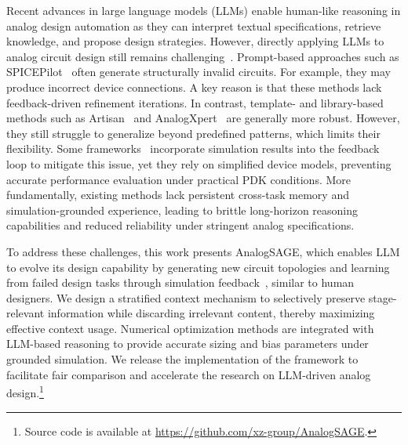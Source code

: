 \documentclass[sigconf,nonacm]{acmart}
\begin{document}
Recent advances in large language models (LLMs) enable human-like reasoning in analog design automation as they can interpret textual specifications, retrieve knowledge, and propose design strategies. However, directly applying LLMs to analog circuit design still remains challenging~\cite{guo2025toward,akbari2025circuitsense}. 
Prompt-based approaches such as SPICEPilot~\cite{vungarala2024spicepilot} often generate structurally invalid circuits. For example, they may produce incorrect device connections. A key reason is that these methods lack feedback-driven refinement iterations. In contrast, template- and library-based methods such as Artisan~\cite{chen2024artisan} and AnalogXpert~\cite{zhang2025analogxpert} are generally more robust. However, they still struggle to generalize beyond predefined patterns, which limits their flexibility.
Some frameworks~\cite{lai2025analogcoder,chen2025menter} incorporate simulation results into the feedback loop to mitigate this issue, yet they rely on simplified device models, preventing accurate performance evaluation under practical PDK conditions. More fundamentally, existing methods lack persistent cross-task memory and simulation-grounded experience, leading to brittle long-horizon reasoning capabilities and reduced reliability under stringent analog specifications.

To address these challenges, this work presents AnalogSAGE, which enables LLM to evolve its design capability by generating new circuit topologies and learning from failed design tasks through simulation feedback~\cite{yang2025zerosim}, similar to human designers.
We design a stratified context mechanism to selectively preserve stage-relevant information while discarding irrelevant content, thereby maximizing effective context usage.
Numerical optimization methods are integrated with LLM-based reasoning to provide accurate sizing and bias parameters under grounded simulation. We release the implementation of the framework to facilitate fair comparison and accelerate the research on LLM-driven analog design.\footnote{Source code is available at \url{https://github.com/xz-group/AnalogSAGE}.}
\end{document}
